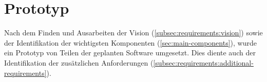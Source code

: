 
\chapter{Prototyp}
\label{chap:prototype}

Nach dem Finden und Ausarbeiten der Vision (\ref{subsec:requirements:vision})
sowie der Identifikation der wichtigsten Komponenten
(\ref{sec:main-components}), wurde ein Prototyp von Teilen der geplanten
Software umgesetzt. Dies diente auch der Identifikation der zusätzlichen
Anforderungen (\ref{subsec:requirements:additional-requirements}).






